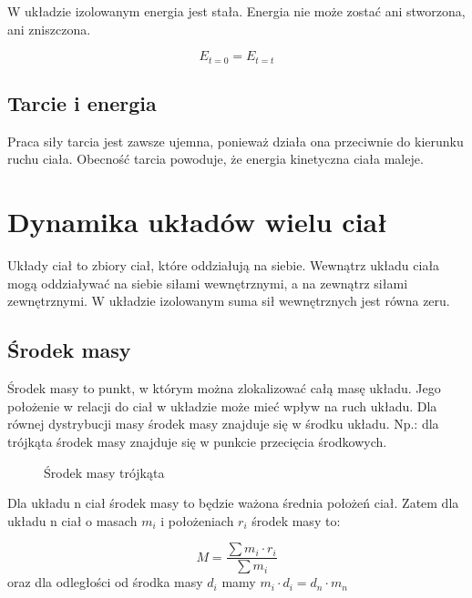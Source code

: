 \documentclass{../notatki}
\begin{document}
W układzie izolowanym energia jest stała. Energia nie może zostać ani stworzona,
ani zniszczona.

$$
E_{t=0} = E_{t=t}
$$

\subsection{Tarcie i energia}

Praca siły tarcia jest zawsze ujemna, ponieważ działa ona przeciwnie do kierunku
ruchu ciała. Obecność tarcia powoduje, że energia kinetyczna ciała maleje.

\section{Dynamika układów wielu ciał}

Układy ciał to zbiory ciał, które oddziałują na siebie. Wewnątrz układu ciała
mogą oddziaływać na siebie siłami wewnętrznymi, a na zewnątrz siłami
zewnętrznymi. W układzie izolowanym suma sił wewnętrznych jest równa zeru.

\subsection{Środek masy}

Środek masy to punkt, w którym można zlokalizować całą masę układu. Jego
położenie w relacji do ciał w układzie może mieć wpływ na ruch układu.
Dla równej dystrybucji masy środek masy znajduje się w środku układu.
Np.: dla trójkąta środek masy znajduje się w punkcie przecięcia środkowych.

\begin{figure*}[ht]
  \centering
  \caption{Środek masy trójkąta}
\end{figure*}
Dla układu n ciał środek masy to będzie ważona średnia położeń ciał. Zatem dla
układu n ciał o masach $m_i$ i położeniach $r_i$ środek masy to:

$$
M = \frac{\sum m_i \cdot r_i}{\sum m_i}
$$
oraz dla odległości od środka masy $d_i$ mamy $m_i \cdot d_i = d_n \cdot m_n$
\end{document}
